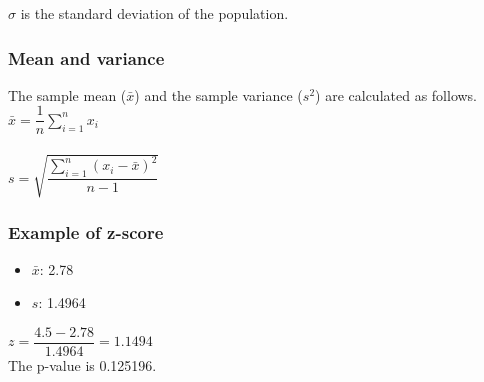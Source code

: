 $\sigma$ is the standard deviation of the population.

%
%
\subsubsection*{Mean and variance}
The sample mean ($\bar{x}$) and the sample variance ($s^2$) are calculated as follows. \\

$\bar{x} =\dfrac{1}{n} \sum_{i=1}^{n}x_{i}$ \\ \\

$s = \sqrt{\dfrac{\sum_{i=1}^{n}(x_{i}-\bar{x})^2}{n-1}}$

%
%
\subsubsection*{Example of z-score}

\begin{itemize}
\item $\bar{x}$: 2.78	
\item $s$: 1.4964
\end{itemize}

$z = \dfrac{4.5-2.78}{1.4964} = 1.1494$ \\

The p-value is 0.125196.

\bigskip 

%
